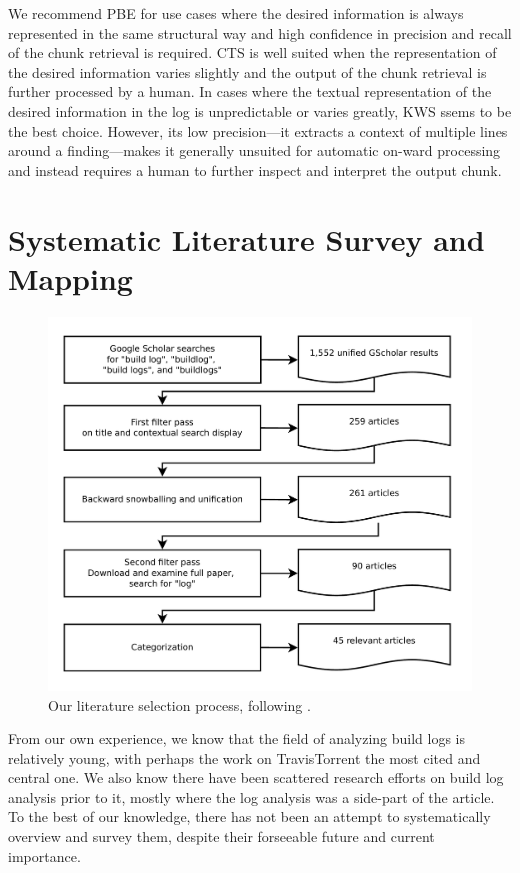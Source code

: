 We recommend PBE for use cases where the desired information is always
represented in the same structural way and high confidence in precision and
recall of the chunk retrieval is required.
CTS is well suited when the representation of the desired information varies
slightly and the output of the chunk retrieval is further processed by a human.
In cases where the textual representation of the desired information in the log
is unpredictable or varies greatly, KWS ssems to be the best choice. However, its low precision---it extracts a context of multiple lines around a finding---makes it generally unsuited for automatic on-ward processing and instead requires a human to further inspect and interpret the output chunk.


\section{Systematic Literature Survey and Mapping}
\label{sec:survey}

\begin{figure}[htb]
        \centering
	\includegraphics[width=\columnwidth, clip]{img/lit_survey.pdf}
	\caption{Our literature selection process, following \cite{petersen2015guidelines}.}
	\label{fig:lit-survey}
\end{figure}

From our own experience, we know that the field of analyzing build
logs is relatively young, with perhaps the work on TravisTorrent the
most cited and central one. We also know there have been scattered
research efforts on build log analysis prior to it, mostly where the
log analysis was a side-part of the article. To the best of our
knowledge, there has not been an attempt to systematically overview
and survey them, despite their forseeable future and current importance.


